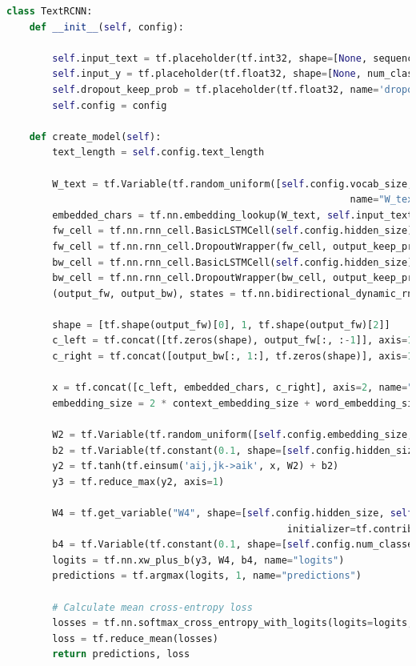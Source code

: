 \documentclass[twoside,a4paper,12pt]{book}%
\begin{document}
\begin{lstlisting}[language={python}]
class TextRCNN:
	def __init__(self, config):

		self.input_text = tf.placeholder(tf.int32, shape=[None, sequence_length], name='input_text')
		self.input_y = tf.placeholder(tf.float32, shape=[None, num_classes], name='input_y')
		self.dropout_keep_prob = tf.placeholder(tf.float32, name='dropout_keep_prob')
		self.config = config

	def create_model(self):
		text_length = self.config.text_length

		W_text = tf.Variable(tf.random_uniform([self.config.vocab_size, self.config.word_embedding_size], -1.0, 1.0),
															name="W_text")
		embedded_chars = tf.nn.embedding_lookup(W_text, self.input_text)
		fw_cell = tf.nn.rnn_cell.BasicLSTMCell(self.config.hidden_size)
		fw_cell = tf.nn.rnn_cell.DropoutWrapper(fw_cell, output_keep_prob=self.dropout_keep_prob)
		bw_cell = tf.nn.rnn_cell.BasicLSTMCell(self.config.hidden_size)
		bw_cell = tf.nn.rnn_cell.DropoutWrapper(bw_cell, output_keep_prob=self.dropout_keep_prob)
		(output_fw, output_bw), states = tf.nn.bidirectional_dynamic_rnn(cell_fw=fw_cell, cell_bw=bw_cell,
																			inputs=embedded_chars, sequence_length=text_length, dtype=tf.float32)
		shape = [tf.shape(output_fw)[0], 1, tf.shape(output_fw)[2]]
		c_left = tf.concat([tf.zeros(shape), output_fw[:, :-1]], axis=1, name="context_left")
		c_right = tf.concat([output_bw[:, 1:], tf.zeros(shape)], axis=1, name="context_right")

		x = tf.concat([c_left, embedded_chars, c_right], axis=2, name="x")
		embedding_size = 2 * context_embedding_size + word_embedding_size

		W2 = tf.Variable(tf.random_uniform([self.config.embedding_size, self.config.hidden_size], -1.0, 1.0), name="W2")
		b2 = tf.Variable(tf.constant(0.1, shape=[self.config.hidden_size]), name="b2")
		y2 = tf.tanh(tf.einsum('aij,jk->aik', x, W2) + b2)
		y3 = tf.reduce_max(y2, axis=1)

		W4 = tf.get_variable("W4", shape=[self.config.hidden_size, self.confignum_classes], 
												 initializer=tf.contrib.layers.xavier_initializer())
		b4 = tf.Variable(tf.constant(0.1, shape=[self.config.num_classes]), name="b4")
		logits = tf.nn.xw_plus_b(y3, W4, b4, name="logits")
		predictions = tf.argmax(logits, 1, name="predictions")

		# Calculate mean cross-entropy loss
		losses = tf.nn.softmax_cross_entropy_with_logits(logits=logits, labels=self.input_y)
		loss = tf.reduce_mean(losses)
		return predictions, loss
\end{lstlisting}
\end{document}
